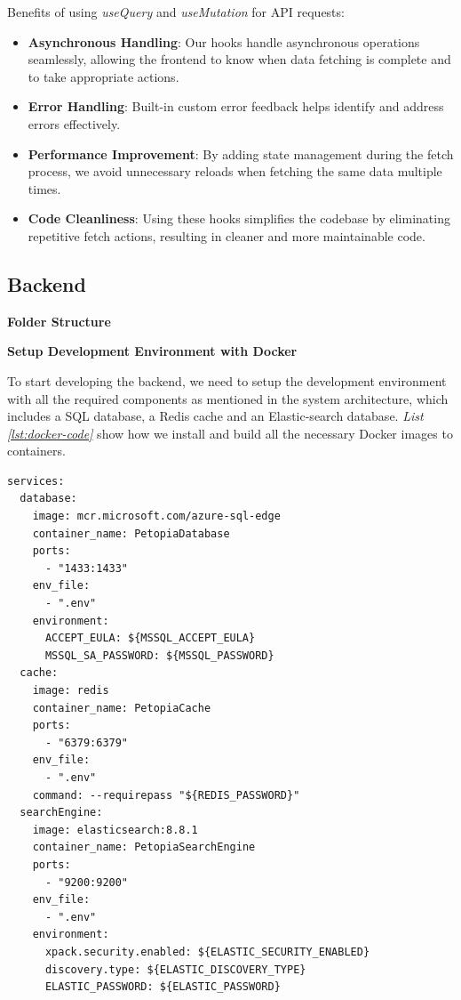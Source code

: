 Benefits of using \textit{useQuery} and \textit{useMutation} for API requests:

\begin{itemize}
    \item \textbf{Asynchronous Handling}: Our hooks handle asynchronous operations seamlessly, allowing the frontend to know when data fetching is complete and to take appropriate actions.
    \item \textbf{Error Handling}: Built-in custom error feedback helps identify and address errors effectively.
    \item \textbf{Performance Improvement}: By adding state management during the fetch process, we avoid unnecessary reloads when fetching the same data multiple times.
    \item \textbf{Code Cleanliness}: Using these hooks simplifies the codebase by eliminating repetitive fetch actions, resulting in cleaner and more maintainable code.
\end{itemize}

\subsection{Backend}


\textbf{Folder Structure}


\textbf{Setup Development Environment with Docker}

To start developing the backend, we need to setup the development environment with
all the required components as mentioned in the system architecture, which includes a SQL database, a Redis cache and an Elastic-search database.
\textit{List \ref{lst:docker-code}} show how we install and build all the necessary Docker images to containers.

\begin{lstlisting}[caption=Setup Development Environment with Docker, label={lst:docker-code}]
services:
  database:
    image: mcr.microsoft.com/azure-sql-edge
    container_name: PetopiaDatabase
    ports:
      - "1433:1433"
    env_file:
      - ".env"
    environment:
      ACCEPT_EULA: ${MSSQL_ACCEPT_EULA}
      MSSQL_SA_PASSWORD: ${MSSQL_PASSWORD}
  cache:
    image: redis
    container_name: PetopiaCache
    ports:
      - "6379:6379"
    env_file:
      - ".env"
    command: --requirepass "${REDIS_PASSWORD}"
  searchEngine:
    image: elasticsearch:8.8.1
    container_name: PetopiaSearchEngine
    ports:
      - "9200:9200"
    env_file:
      - ".env"
    environment:
      xpack.security.enabled: ${ELASTIC_SECURITY_ENABLED}
      discovery.type: ${ELASTIC_DISCOVERY_TYPE}
      ELASTIC_PASSWORD: ${ELASTIC_PASSWORD}
\end{lstlisting}

